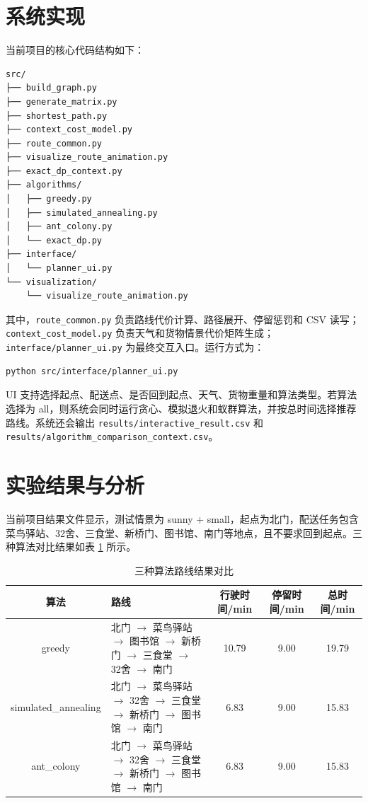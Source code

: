 \documentclass[12pt,a4paper,UTF8]{article}
\begin{document}
\newpage
\section{系统实现}

当前项目的核心代码结构如下：
\begin{verbatim}
src/
├── build_graph.py
├── generate_matrix.py
├── shortest_path.py
├── context_cost_model.py
├── route_common.py
├── visualize_route_animation.py
├── exact_dp_context.py
├── algorithms/
│   ├── greedy.py
│   ├── simulated_annealing.py
│   ├── ant_colony.py
│   └── exact_dp.py
├── interface/
│   └── planner_ui.py
└── visualization/
    └── visualize_route_animation.py
\end{verbatim}

其中，\texttt{route\_common.py} 负责路线代价计算、路径展开、停留惩罚和 CSV 读写；\texttt{context\_cost\_model.py} 负责天气和货物情景代价矩阵生成；\texttt{interface/planner\_ui.py} 为最终交互入口。运行方式为：
\begin{verbatim}
python src/interface/planner_ui.py
\end{verbatim}

UI 支持选择起点、配送点、是否回到起点、天气、货物重量和算法类型。若算法选择为 all，则系统会同时运行贪心、模拟退火和蚁群算法，并按总时间选择推荐路线。系统还会输出 \texttt{results/interactive\_result.csv} 和 \texttt{results/algorithm\_comparison\_context.csv}。

\newpage
\section{实验结果与分析}

当前项目结果文件显示，测试情景为 sunny + small，起点为北门，配送任务包含菜鸟驿站、32舍、三食堂、新桥门、图书馆、南门等地点，且不要求回到起点。三种算法对比结果如表 \ref{tab:comparison} 所示。

\begin{table}[H]
\centering
\caption{三种算法路线结果对比}
\label{tab:comparison}
\small
\begin{tabularx}{\textwidth}{c|X|c|c|c}
\hline
算法 & 路线 & 行驶时间/min & 停留时间/min & 总时间/min \\
\hline
greedy & 北门 $\rightarrow$ 菜鸟驿站 $\rightarrow$ 图书馆 $\rightarrow$ 新桥门 $\rightarrow$ 三食堂 $\rightarrow$ 32舍 $\rightarrow$ 南门 & 10.79 & 9.00 & 19.79 \\
\hline
simulated\_annealing & 北门 $\rightarrow$ 菜鸟驿站 $\rightarrow$ 32舍 $\rightarrow$ 三食堂 $\rightarrow$ 新桥门 $\rightarrow$ 图书馆 $\rightarrow$ 南门 & 6.83 & 9.00 & 15.83 \\
\hline
ant\_colony & 北门 $\rightarrow$ 菜鸟驿站 $\rightarrow$ 32舍 $\rightarrow$ 三食堂 $\rightarrow$ 新桥门 $\rightarrow$ 图书馆 $\rightarrow$ 南门 & 6.83 & 9.00 & 15.83 \\
\hline
\end{tabularx}
\end{table}
\end{document}
